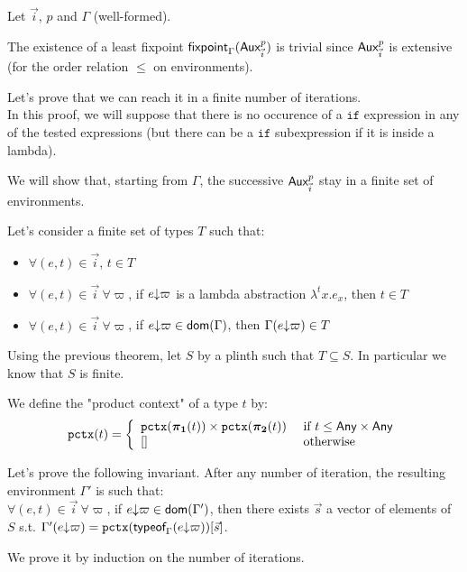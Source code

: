 \documentclass[a4paper]{article}
\theoremstyle{definition}
\begin{document}
    Let $\vec i$, $p$ and $\Gamma$ (well-formed).

    The existence of a least fixpoint $\textsf{fixpoint}_\Gamma (\textsf{Aux}^{p}_{\vec {i}})$ is trivial since $\textsf{Aux}^{p}_{\vec {i}}$ is extensive
    (for the order relation $\leq$ on environments).

    Let's prove that we can reach it in a finite number of iterations.\\
    In this proof, we will suppose that there is no occurence of a $\texttt{if}$ expression in any of the tested expressions
    (but there can be a $\texttt{if}$ subexpression if it is inside a lambda).

    We will show that, starting from $\Gamma$, the successive $\textsf{Aux}^{p}_{\vec {i}}$ stay in a finite set of environments.

    Let's consider a finite set of types $T$ such that:
    \begin{itemize}
      \item $\forall (e,t) \in \vec i$, $t \in T$
      \item $\forall (e,t) \in \vec i\ \forall \varpi$, if $e{\downarrow}\varpi$ is a lambda abstraction $\lambda^tx.e_x$, then $t \in T$
      \item $\forall (e,t) \in \vec i\ \forall \varpi$, if $e{\downarrow}\varpi \in \textsf{dom}(\Gamma)$, then $\Gamma(e{\downarrow}\varpi) \in T$
    \end{itemize}

    Using the previous theorem, let $S$ by a plinth such that $T \subseteq S$. In particular we know that $S$ is finite.

    We define the "product context" of a type $t$ by:
    \[
      \texttt{pctx}(t)=\left\{
        \begin{array}{ll}
          \texttt{pctx}(\boldsymbol{\pi}_{\boldsymbol 1}(t))\times \texttt{pctx}(\boldsymbol{\pi}_{\boldsymbol 2}(t)) & \text{ if } t \leq \textsf{Any}\times \textsf{Any}\\
          {[}] & \text{ otherwise}
        \end{array}  
      \right.
    \]

    Let's prove the following invariant. After any number of iteration, the resulting environment $\Gamma'$ is such that:\\
    $\forall (e,t) \in \vec i\ \forall \varpi$, if $e{\downarrow}\varpi \in \textsf{dom}(\Gamma')$, then there exists $\vec s$ a vector of elements of $S$ s.t. $\Gamma'(e{\downarrow}\varpi) = \texttt{pctx}(\textsf{typeof}_{\Gamma}(e{\downarrow}\varpi))[\vec s]$.
    
    We prove it by induction on the number of iterations.
\end{document}
